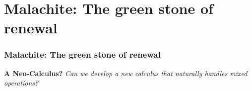 \documentclass[aspectratio=169]{beamer}
\begin{document}

\section{Malachite: The green stone of renewal}

\begin{frame}
    \frametitle{Malachite: The green stone of renewal}
    \begin{center}
        \Large
        \textbf{A Neo-Calculus?}\newline\newline
        \emph{Can we develop a new calculus that naturally handles mixed operations?}
    \end{center}
\end{frame}
\end{document}
